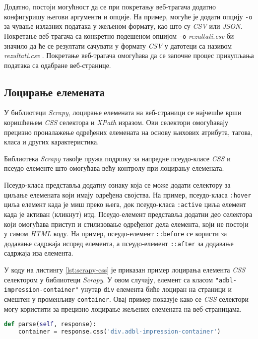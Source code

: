 \documentclass[12pt,oneside]{memoir}
\begin{document}
Додатно, постоји могућност да се при покретању веб-трагача додатно конфигуришу његови аргументи и опције. На пример, могуће је додати опцију \texttt{-o} за чување излазних података у жељеном формату, као што су \textit{CSV} или \textit{JSON}. Покретање веб-трагача са конкретно подешеном опцијом \texttt{-o} \textit{rezultati.csv} би значило да ће се резултати сачувати у формату \textit{CSV} у датотеци са називом \textit{rezultati.csv} \cite{WebScrapingWithPython}. Покретање веб-трагача омогућава да се започне процес прикупљања података са одабране веб-странице.

\subsection{Лоцирање елемената}
У библиотеци \textit{Scrapy}, лоцирање елемената на веб-страници се најчешће врши коришћењем \textit{CSS} селектора и \textit{XPath} изразом. Ови селектори омогућавају прецизно проналажење одређених елемената на основу њихових атрибута, тагова, класа и других карактеристика.

Библиотека \textit{Scrapy} такође пружа подршку за напредне псеудо-класе \textit{CSS} и псеудо-елементе што омогућава већу контролу при лоцирању елемената.

Псеудо-класа представља додатну ознаку која се може додати селектору за циљање елемената који имају одређена својства. На пример, псеудо-класа \texttt{:hover} циља елемент када је миш преко њега, док псеудо-класа \texttt{:active} циља елемент када је активан (кликнут) итд. Псеудо-елемент представља додатни део селектора који омогућава приступ и стилизовање одређеног дела елемента, који не постоји у самом  \textit{HTML} коду. На пример, псеудо-елемент \texttt{::before} се користи за додавање садржаја испред елемента, а псеудо-елемент \texttt{::after} за додавање садржаја иза елемента.

У коду на листингу \ref{lst:scrapy-css} је приказан пример лоцирања елемента \textit{CSS} селектором у библиотеци \textit{Scrapy}. У овом случају, елемент са класом \texttt{"adbl-impression-container"} унутар \texttt{div} елемента биће лоциран на страници и смештен у променљиву \texttt{container}. Овај пример показује како се \textit{CSS} селектори могу користити за прецизно лоцирање жељених елемената на веб-страницама.
\begin{lstlisting}[language=Python, caption={Лоцирање елемента \textit{CSS} селектором}, label={lst:scrapy-css}]
def parse(self, response):
    container = response.css('div.adbl-impression-container')
\end{lstlisting}
\end{document}
